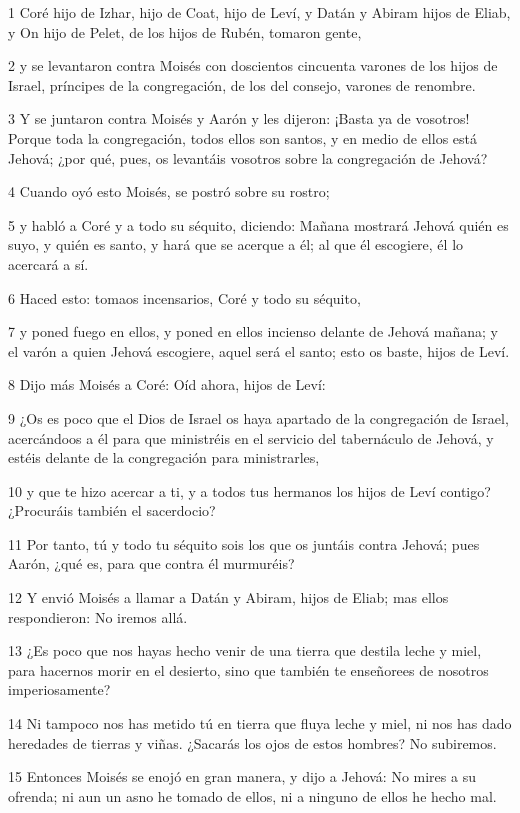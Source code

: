 \par 1 Coré hijo de Izhar, hijo de Coat, hijo de Leví, y Datán y Abiram hijos de Eliab, y On hijo de Pelet, de los hijos de Rubén, tomaron gente,
\par 2 y se levantaron contra Moisés con doscientos cincuenta varones de los hijos de Israel, príncipes de la congregación, de los del consejo, varones de renombre.
\par 3 Y se juntaron contra Moisés y Aarón y les dijeron: ¡Basta ya de vosotros! Porque toda la congregación, todos ellos son santos, y en medio de ellos está Jehová; ¿por qué, pues, os levantáis vosotros sobre la congregación de Jehová?
\par 4 Cuando oyó esto Moisés, se postró sobre su rostro;
\par 5 y habló a Coré y a todo su séquito, diciendo: Mañana mostrará Jehová quién es suyo, y quién es santo, y hará que se acerque a él; al que él escogiere, él lo acercará a sí.
\par 6 Haced esto: tomaos incensarios, Coré y todo su séquito,
\par 7 y poned fuego en ellos, y poned en ellos incienso delante de Jehová mañana; y el varón a quien Jehová escogiere, aquel será el santo; esto os baste, hijos de Leví.
\par 8 Dijo más Moisés a Coré: Oíd ahora, hijos de Leví:
\par 9 ¿Os es poco que el Dios de Israel os haya apartado de la congregación de Israel, acercándoos a él para que ministréis en el servicio del tabernáculo de Jehová, y estéis delante de la congregación para ministrarles,
\par 10 y que te hizo acercar a ti, y a todos tus hermanos los hijos de Leví contigo? ¿Procuráis también el sacerdocio?
\par 11 Por tanto, tú y todo tu séquito sois los que os juntáis contra Jehová; pues Aarón, ¿qué es, para que contra él murmuréis?
\par 12 Y envió Moisés a llamar a Datán y Abiram, hijos de Eliab; mas ellos respondieron: No iremos allá.
\par 13 ¿Es poco que nos hayas hecho venir de una tierra que destila leche y miel, para hacernos morir en el desierto, sino que también te enseñorees de nosotros imperiosamente?
\par 14 Ni tampoco nos has metido tú en tierra que fluya leche y miel, ni nos has dado heredades de tierras y viñas. ¿Sacarás los ojos de estos hombres? No subiremos.
\par 15 Entonces Moisés se enojó en gran manera, y dijo a Jehová: No mires a su ofrenda; ni aun un asno he tomado de ellos, ni a ninguno de ellos he hecho mal.
